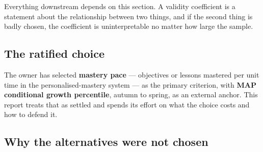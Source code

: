 \documentclass[11pt,a4paper]{article}
\begin{document}
Everything downstream depends on this section. A validity coefficient is a
statement about the relationship between two things, and if the second thing is
badly chosen, the coefficient is uninterpretable no matter how large the sample.

\subsection{The ratified choice}

The owner has selected \textbf{mastery pace} --- objectives or lessons mastered
per unit time in the personalised-mastery system --- as the primary criterion,
with \textbf{MAP conditional growth percentile}, autumn to spring, as an
external anchor. This report treats that as settled and spends its effort on
what the choice costs and how to defend it.

\subsection{Why the alternatives were not chosen}
\end{document}

